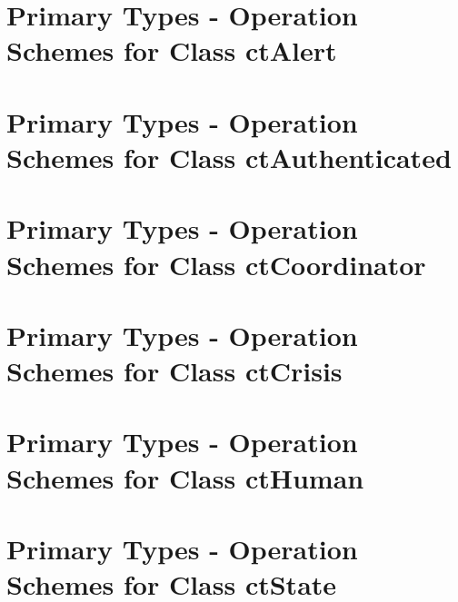 \section{Primary Types - Operation Schemes for Class ctAlert} 
\label{OM-CM-PTClass-ctAlert}


\section{Primary Types - Operation Schemes for Class ctAuthenticated} 
\label{OM-CM-PTClass-ctAuthenticated}

\section{Primary Types - Operation Schemes for Class ctCoordinator} 
\label{OM-CM-PTClass-ctCoordinator}

\section{Primary Types - Operation Schemes for Class ctCrisis} 
\label{OM-CM-PTClass-ctCrisis}





\section{Primary Types - Operation Schemes for Class ctHuman} 
\label{OM-CM-PTClass-ctHuman}


\section{Primary Types - Operation Schemes for Class ctState} 
\label{OM-CM-PTClass-ctState}




